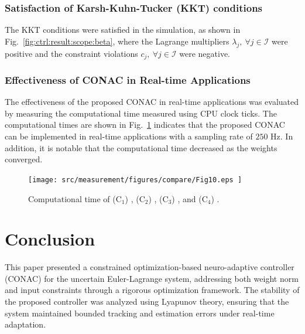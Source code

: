 \documentclass[lettersize,journal]{IEEEtran}
\begin{document}
\hfill
\subsubsection{Satisfaction of Karsh-Kuhn-Tucker (KKT) conditions}


The KKT conditions were satisfied in the simulation, as shown in Fig.~\ref{fig:ctrl:result:scope:beta}, where the Lagrange multipliers $\lambda_j,\ \forall j\in\mathcal I$ were positive and the constraint violations $c_j,\ \forall j\in\mathcal I$ were negative.

\hfill
\subsubsection{Effectiveness of CONAC in Real-time Applications}

The effectiveness of the proposed CONAC in real-time applications was evaluated by measuring the computational time measured using CPU clock ticks.
The computational times are shown in Fig.~\ref{fig:ctrl:real:result:cmp:time} indicates that the proposed CONAC can be implemented in real-time applications with a sampling rate of $250$ Hz.
In addition, it is notable that the computational time decreased as the weights converged.

\begin{figure}[t]
    \centering
        \texttt{[image: 
            src/measurement/figures/compare/Fig10.eps
        ]}%
    \caption{
        Computational time of (C$_1$) \protect{}, (C$_2$) \protect{}, (C$_3$) \protect{}, and (C$_4$) \protect{}.
    }
    \label{fig:ctrl:real:result:cmp:time}
  \end{figure}

\section{Conclusion}\label{sec:conclusion}

This paper presented a constrained optimization-based neuro-adaptive controller (CONAC) for the uncertain Euler-Lagrange system, addressing both weight norm and input constraints through a rigorous optimization framework. 
The stability of the proposed controller was analyzed using Lyapunov theory, ensuring that the system maintained bounded tracking and estimation errors under real-time adaptation.
\end{document}
